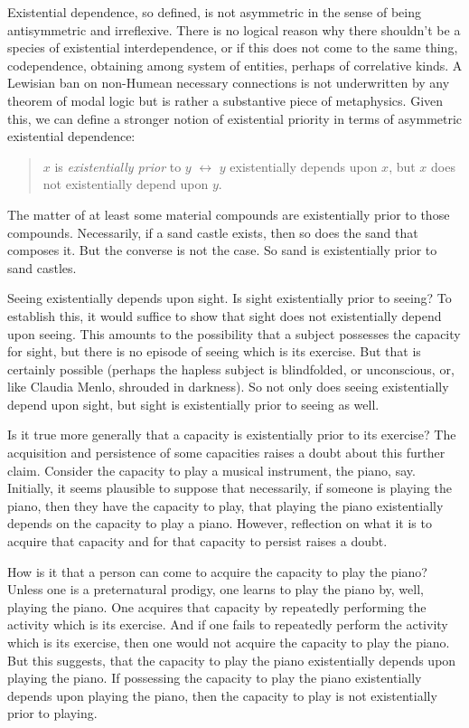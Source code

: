 \documentclass[12pt]{article}
\begin{document}
Existential dependence, so defined, is not asymmetric in the sense of being antisymmetric and irreflexive. There is no logical reason why there shouldn't be a species of existential interdependence, or if this does not come to the same thing, codependence, obtaining among system of entities, perhaps of correlative kinds. A Lewisian ban on non-Humean necessary connections is not underwritten by any theorem of modal logic but is rather a substantive piece of metaphysics. Given this, we can define a stronger notion of existential priority in terms of asymmetric existential dependence:
\begin{quote}
    \( x \) is \emph{existentially prior} to \( y \) \( \leftrightarrow \) \( y \) existentially depends upon \( x \), but \( x \) does not existentially depend upon \( y \).
\end{quote}
The matter of at least some material compounds are existentially prior to those compounds. Necessarily, if a sand castle exists, then so does the sand that composes it. But the converse is not the case. So sand is existentially prior to sand castles.

Seeing existentially depends upon sight. Is sight existentially prior to seeing? To establish this, it would suffice to show that sight does not existentially depend upon seeing. This amounts to the possibility that a subject possesses the capacity for sight, but there is no episode of seeing which is its exercise. But that is certainly possible (perhaps the hapless subject is blindfolded, or unconscious, or, like Claudia Menlo, shrouded in darkness). So not only does seeing existentially depend upon sight, but sight is existentially prior to seeing as well.

Is it true more generally that a capacity is existentially prior to its exercise? The acquisition and persistence of some capacities raises a doubt about this further claim. Consider the capacity to play a musical instrument, the piano, say. Initially, it seems plausible to suppose that necessarily, if someone is playing the piano, then they have the capacity to play, that playing the piano existentially depends on the capacity to play a piano. However, reflection on what it is to acquire that capacity and for that capacity to persist raises a doubt. 

How is it that a person can come to acquire the capacity to play the piano? Unless one is a preternatural prodigy, one learns to play the piano by, well, playing the piano. One acquires that capacity by repeatedly performing the activity which is its exercise. And if one fails to repeatedly perform the activity which is its exercise, then one would not acquire the capacity to play the piano. But this suggests, that the capacity to play the piano existentially depends upon playing the piano. If possessing the capacity to play the piano existentially depends upon playing the piano, then the capacity to play is not existentially prior to playing. 
\end{document}
